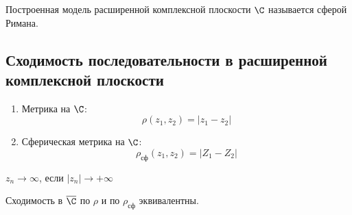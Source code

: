 Построенная модель расширенной комплексной плоскости $\C$ называется сферой Римана.
\subsection{Сходимость последовательности в расширенной комплексной плоскости}
\begin{definition}
  \begin{enumerate}
    \item Метрика на $\C$:
    \[\rho(z_1,z_2) = |z_1-z_2|\]
    \item Сферическая метрика на $\C$:
    \[\rho_{\text{сф}}(z_1,z_2)=|Z_1-Z_2|\]
  \end{enumerate}
\end{definition}
\begin{definition}
  $z_n\to \infty$, если $|z_n|\to+\infty$
\end{definition}
\begin{theorem}
  Сходимость в $\overline{\C}$ по $\rho$ и по $\rho_{\text{сф}}$ эквивалентны.
\end{theorem}
